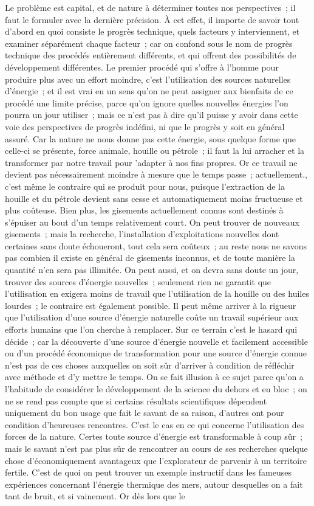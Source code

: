 \documentclass[french,twoside]{book} %
\begin{document}
Le problème est capital, et de nature à déterminer toutes nos perspectives ; il faut le formuler avec la dernière précision. À cet effet, il importe de savoir tout d'abord en quoi consiste le progrès technique, quels facteurs y interviennent, et examiner séparément chaque facteur ; car on confond sous le nom de progrès technique des procédés entièrement différents, et qui offrent des possibilités de développement différentes. Le premier procédé qui s'offre à l'homme pour produire plus avec un effort moindre, c'est l'utilisation des sources naturelles d'énergie ; et il est vrai en un sens qu'on ne peut assigner aux bienfaits de ce procédé une limite précise, parce qu'on ignore quelles nouvelles énergies l'on pourra un jour utiliser ; mais ce n'est pas à dire qu'il puisse y avoir dans cette voie des perspectives de progrès indéfini, ni que le progrès y soit en général assuré. Car la nature ne nous donne pas cette énergie, sous quelque forme que celle-ci se présente, force animale, houille ou pétrole ; il faut la lui arracher et la transformer par notre travail pour 'adapter à nos fins propres. Or ce travail ne devient pas nécessairement moindre à mesure que le temps passe ; actuellement., c'est même le contraire qui se produit pour nous, puisque l'extraction de la houille et du pétrole devient sans cesse et automatiquement moins fructueuse et plus coûteuse. Bien plus, les gisements actuellement connus sont destinés à s'épuiser au bout d'un temps relativement court. On peut trouver de nouveaux gisements ; mais la recherche, l'installation d'exploitations nouvelles dont certaines sans doute échoueront, tout cela sera coûteux ; au reste nous ne savons pas combien il existe en général de gisements inconnus, et de toute manière la quantité n'en sera pas illimitée. On peut aussi, et on devra sans doute un jour, trouver des sources d'énergie nouvelles ; seulement rien ne garantit que l'utilisation en exigera moins de travail que l'utilisation de la houille ou des huiles lourdes ; le contraire est également possible. Il peut même arriver à la rigueur que l'utilisation d'une source d'énergie naturelle coûte un travail supérieur aux efforts humains que l'on cherche à remplacer. Sur ce terrain c'est le hasard qui décide ; car la découverte d'une source d'énergie nouvelle et facilement accessible ou d'un procédé économique de transformation pour une source d'énergie connue n'est pas de ces choses auxquelles on soit sûr d'arriver à condition de réfléchir avec méthode et d'y mettre le temps. On se fait illusion à ce sujet parce qu'on a l'habitude de considérer le développement de la science du dehors et en bloc ; on ne se rend pas compte que si certains résultats scientifiques dépendent uniquement du bon usage que fait le savant de sa raison, d'autres ont pour condition d'heureuses rencontres. C'est le cas en ce qui concerne l'utilisation des forces de la nature. Certes toute source d'énergie est transformable à coup sûr ; mais le savant n'est pas plus sûr de rencontrer au cours de ses recherches quelque chose d'économiquement avantageux que l'explorateur de parvenir à un territoire fertile. C'est de quoi on peut trouver un exemple instructif dans les fameuses expériences concernant l'énergie thermique des mers, autour desquelles on a fait tant de bruit, et si vainement. Or dès lors que le 
\end{document}
